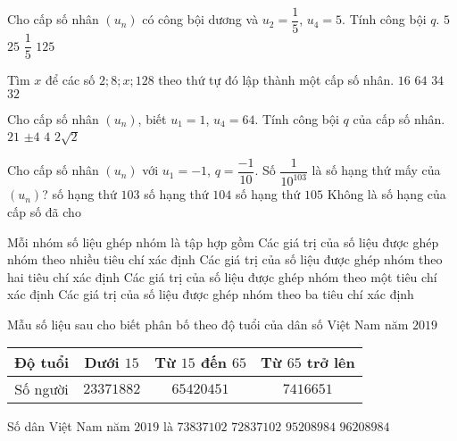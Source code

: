 \begin{ex}%
	Cho cấp số nhân $\left(u_{n}\right)$ có công bội dương và $u_{2}=\dfrac{1}{5}$, $u_{4}=5$. Tính công bội $q$.
	\choice
	{\True $5$}
	{$25$}
	{$\dfrac{1}{5}$}
	{$125$}
\end{ex}
\begin{ex}%
	Tìm $x$ để các số $2;8;x;128$ theo thứ tự đó lập thành một cấp số nhân.
	\choice
	{$16$}
	{$64$}
	{$34$}
	{\True $32$}
\end{ex}
\begin{ex}%
	Cho cấp số nhân $\left(u_{n}\right)$, biết $u_{1}=1$, $u_{4}=64$. Tính công bội $q$ của cấp số nhân.
	\choice
	{$21$}
	{$\pm4$}
	{\True $4$}
	{$2\sqrt{2}$}
\end{ex}
\begin{ex}%
	Cho cấp số nhân $\left(u_{n}\right)$ với $u_{1}=-1$, $q=\dfrac{-1}{10}$. Số $\dfrac{1}{10^{103}}$ là số hạng thứ mấy của $\left(u_{n}\right)$?
	\choice
	{số hạng thứ $103$}
	{\True số hạng thứ $104$}
	{số hạng thứ $105$}
	{Không là số hạng của cấp số đã cho}
\end{ex}
\begin{ex}%
	Mỗi nhóm số liệu ghép nhóm là tập hợp gồm
	\choice
	{Các giá trị của số liệu được ghép nhóm theo nhiều tiêu chí xác định}
	{Các giá trị của số liệu được ghép nhóm theo hai tiêu chí xác định}
	{\True Các giá trị của số liệu được ghép nhóm theo một tiêu chí xác định}
	{Các giá trị của số liệu được ghép nhóm theo ba tiêu chí xác định}
\end{ex}
\begin{ex}%
	Mẫu số liệu sau cho biết phân bố theo độ tuổi của dân số Việt Nam năm $2019$\\
	\begin{center}
		\begin{tabular}{|c|c|c|c|}
		\hline
		Độ tuổi& Dưới $15$ & Từ $15$ đến $65$ & Từ $65$ trở lên\\
		\hline
		Số người& $23 371 882$ & $65 420 451$ & $7 416 651$\\
		\hline
	\end{tabular}
	\end{center}
	Số dân Việt Nam năm $2019$ là
	\choice
	{$73837102$}
	{$72837102$}
	{$95208984$}
	{\True $96208984$}
\end{ex}
